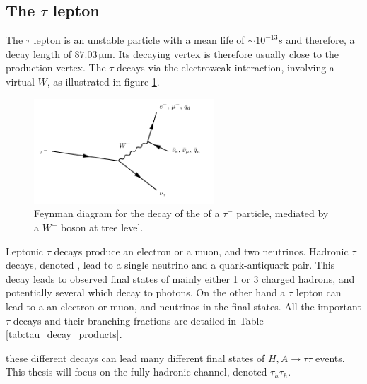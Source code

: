 \subsection{The $\tau$ lepton}
\label{sec:tau_lepton}
The $\tau$ lepton is an unstable particle with a mean life of $\sim 10^{-13} s$ \cite{pdg2016} and therefore, a decay length of $87.03\, \mathrm{\mu m}$. Its decaying vertex is therefore usually close to the production vertex. The $\tau$ decays via the electroweak interaction, involving a virtual $W$, as illustrated in figure \ref{fig:tau_decay}.

\begin{figure}
    \centering
    \includegraphics[width=0.6\textwidth]{Images/taudecay.pdf}
    \caption{Feynman diagram for the decay of the of a $\tau^-$ particle, mediated by a $W^-$ boson at tree level.}
    \label{fig:tau_decay}
\end{figure}

Leptonic $\tau$ decays produce an electron or a muon, and two neutrinos. Hadronic $\tau$ decays, denoted \tauh, lead to a single neutrino and a quark-antiquark pair. This decay leads to observed final states of mainly either 1 or 3 charged hadrons, and potentially several \pizero which decay to photons. On the other hand a $\tau$ lepton can lead to a an electron or muon, and neutrinos in the final states. All the important $\tau$ decays and their branching fractions are detailed in Table \ref{tab:tau_decay_products}. 

these different decays can lead many different final states of $H,A \rightarrow \tau\tau$ events. This thesis will focus on the fully hadronic channel, denoted $\tau_h \tau_h$.



